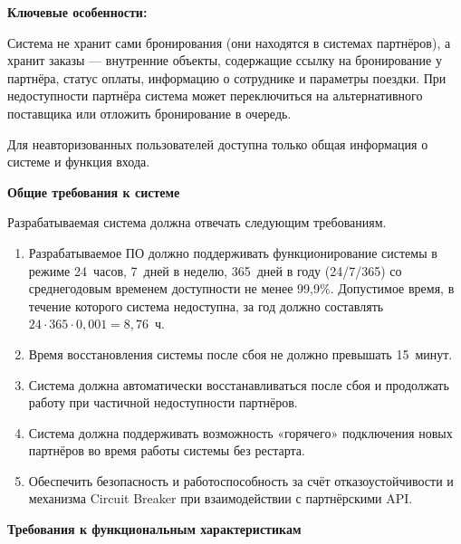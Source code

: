 \documentclass{bmstu}
\begin{document}
\textbf{Ключевые особенности:}

Система не хранит сами бронирования (они находятся в системах партнёров), а хранит заказы — внутренние объекты, содержащие ссылку на бронирование у партнёра, статус оплаты, информацию о сотруднике и параметры поездки. При недоступности партнёра система может переключиться на альтернативного поставщика или отложить бронирование в очередь.

Для неавторизованных пользователей доступна только общая информация о системе и функция входа.


\newpage

\begin{center}
    \textbf{Общие требования к системе}
\end{center}

Разрабатываемая система должна отвечать следующим требованиям.

\begin{enumerate}
    \item Разрабатываемое ПО должно поддерживать функционирование системы в режиме 24~часов, 7~дней в неделю, 365~дней в году (24/7/365) со среднегодовым временем доступности не менее 99,9\%. Допустимое время, в течение которого система недоступна, за год должно составлять $24 \cdot 365 \cdot 0{,}001 = 8{,}76$~ч.
    
    \item Время восстановления системы после сбоя не должно превышать 15~минут.
    
    \item Система должна автоматически восстанавливаться после сбоя и продолжать работу при частичной недоступности партнёров.
    
    \item Система должна поддерживать возможность «горячего» подключения новых партнёров во время работы системы без рестарта.
    
    \item Обеспечить безопасность и работоспособность за счёт отказоустойчивости и механизма Circuit Breaker при взаимодействии с партнёрскими API.
\end{enumerate}

\begin{center}
    \textbf{Требования к функциональным характеристикам}
\end{center}
\end{document}
